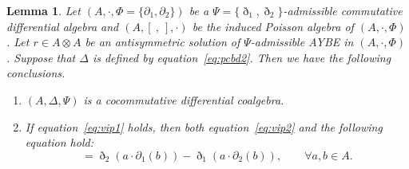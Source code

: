 \documentclass[10pt,a4paper]{amsart}
\numberwithin{equation}{section}
\newtheorem{Lemma}[Theorem]{Lemma}
\begin{document}
\begin{Lemma}\label{lem:tch}
 Let $(A, \cdot, \Phi = \{\partial_1, \partial_2\})$ be a $\Psi = \{\eth_1, \eth_2\}$-admissible commutative differential algebra and $(A, [\ ,\ ], \cdot)$ be the induced Poisson algebra of $(A, \cdot, \Phi)$.
 Let $r \in A \otimes A$ be an antisymmetric solution of $\Psi$-admissible AYBE in $(A, \cdot, \Phi)$.
 Suppose that $\Delta$ is defined by equation~\eqref{eq:pcbd2}.
 Then we have the following conclusions.
 \begin{enumerate}\itemsep=0pt
 \item[$(1)$] $(A, \Delta, \Psi)$ is a cocommutative differential coalgebra.
 \item[$(2)$] If equation~\eqref{eq:vip1} holds, then both equation~\eqref{eq:vip2} and the following equation hold:
 \begin{equation}
 [a, b] = \eth_2(a \cdot \partial_1(b)) - \eth_1(a \cdot \partial_2(b)), \qquad \forall a, b \in A. \label{eq:liepq}
 \end{equation}
 \end{enumerate}
\end{Lemma}
\end{document}
